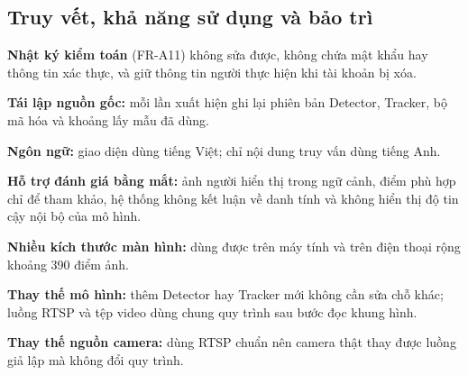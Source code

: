 \subsection{Truy vết, khả năng sử dụng và bảo trì}
\label{sec:4.3.5}
\label{sec:4.3.6}
\label{sec:4.3.7}

\begin{reqlist}
    \item[NFR-17] \textbf{Nhật ký kiểm toán} (FR-A11) không sửa được, không chứa mật khẩu hay thông tin xác thực, và giữ thông tin người thực hiện khi tài khoản bị xóa.
    \item[NFR-18] \textbf{Tái lập nguồn gốc:} mỗi lần xuất hiện ghi lại phiên bản Detector, Tracker, bộ mã hóa và khoảng lấy mẫu đã dùng.
    \item[NFR-19] \textbf{Ngôn ngữ:} giao diện dùng tiếng Việt; chỉ nội dung truy vấn dùng tiếng Anh.
    \item[NFR-20] \textbf{Hỗ trợ đánh giá bằng mắt:} ảnh người hiển thị trong ngữ cảnh, điểm phù hợp chỉ để tham khảo, hệ thống không kết luận về danh tính và không hiển thị độ tin cậy nội bộ của mô hình.
    \item[NFR-21] \textbf{Nhiều kích thước màn hình:} dùng được trên máy tính và trên điện thoại rộng khoảng 390 điểm ảnh.
    \item[NFR-22] \textbf{Thay thế mô hình:} thêm Detector hay Tracker mới không cần sửa chỗ khác; luồng RTSP và tệp video dùng chung quy trình sau bước đọc khung hình.
    \item[NFR-23] \textbf{Thay thế nguồn camera:} dùng RTSP chuẩn nên camera thật thay được luồng giả lập mà không đổi quy trình.
\end{reqlist}

